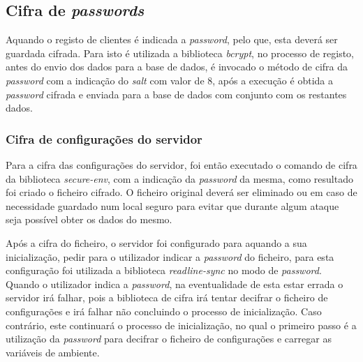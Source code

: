 \subsection{Cifra de \textit{passwords}}
Aquando o registo de clientes é indicada a \textit{password}, pelo que, esta deverá ser guardada cifrada. Para isto é utilizada a biblioteca \textit{bcrypt}, no processo de registo, antes do envio dos dados para a base de dados, é invocado o método de cifra da \textit{password} com a indicação do \textit{salt} com valor de 8, após a execução é obtida a \textit{password} cifrada e enviada para a base de dados com conjunto com os restantes dados.

\subsubsection{Cifra de configurações do servidor}
Para a cifra das configurações do servidor, foi então executado o comando de cifra da biblioteca \textit{secure-env}, com a indicação da \textit{password} da mesma, como resultado foi criado o ficheiro cifrado. O ficheiro original deverá ser eliminado ou em caso de necessidade guardado num local seguro para evitar que durante algum ataque seja possível obter os dados do mesmo.

Após a cifra do ficheiro, o servidor foi configurado para aquando a sua inicialização, pedir para o utilizador indicar a \textit{password} do ficheiro, para esta configuração foi utilizada a biblioteca \textit{readline-sync} no modo de \textit{password}. Quando o utilizador indica a \textit{password}, na eventualidade de esta estar errada o servidor irá falhar, pois a biblioteca de cifra irá tentar decifrar o ficheiro de configurações e irá falhar não concluindo o processo de inicialização. Caso contrário, este continuará o processo de inicialização, no qual o primeiro passo é a utilização da \textit{password} para decifrar o ficheiro de configurações e carregar as variáveis de ambiente.